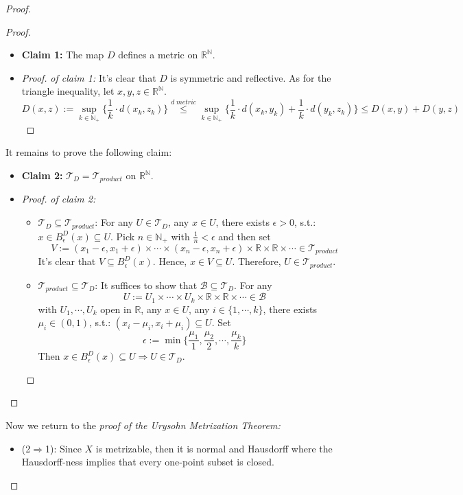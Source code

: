 \begin{proof}
\begin{proof}
        \begin{itemize}
            \item \textbf{Claim 1:} The map $D$ defines a metric on $\mathbb{R}^\mathbb{N}$.
            \item \begin{proof}
                \textit{of claim 1:} It's clear that $D$ is symmetric and reflective. As for the triangle inequality, let $x,y,z \in \mathbb{R}^\mathbb{N}$.
                $$D(x,z) := \sup_{k \in \mathbb{N}_+} \{\frac{1}{k} \cdot d(x_k, z_k) \} \overset{d\;metric}{\leq} \sup_{k \in \mathbb{N}_+} \{\frac{1}{k} \cdot d(x_k, y_k) + \frac{1}{k} \cdot d(y_k, z_k) \} \leq D(x,y) +D(y,z)$$
            \end{proof}
        \end{itemize}
        It remains to prove the following claim:
        \begin{itemize}
            \item \textbf{Claim 2:} $\mathcal{T}_D = \mathcal{T}_{product}$ on $\mathbb{R}^\mathbb{N}$.
            \item \begin{proof}
                \textit{of claim 2:} \begin{itemize}
                    \item $\mathcal{T}_D \subseteq \mathcal{T}_{product}$: For any $U \in \mathcal{T}_D$, any $x \in U$, there exists $\epsilon>0$, s.t.: $x \in B_\epsilon^D (x) \subseteq U$. Pick $n \in \mathbb{N}_+$ with $\frac{1}{n}< \epsilon$ and then set
                    $$V:= (x_1-\epsilon,x_1 + \epsilon) \times \cdots \times  (x_n-\epsilon, x_n+\epsilon) \times \mathbb{R} \times \mathbb{R} \times \cdots \in \mathcal{T}_{product}$$
                    It's clear that $V \subseteq B_\epsilon^D(x)$. Hence, $x \in V \subseteq U$. Therefore, $U \in \mathcal{T}_{product}$.

                    \item $\mathcal{T}_{product} \subseteq \mathcal{T}_D$: It suffices to show that $\mathcal{B} \subseteq \mathcal{T}_D$. For any
                    $$U:= U_1 \times \cdots\times U_k \times \mathbb{R} \times \mathbb{R} \times \cdots \in \mathcal{B}$$
                    with $U_1,\cdots,U_k$ open in $\mathbb{R}$, any $x \in U$, any $i \in \{1,\cdots,k\}$, there exists $\mu_i \in (0,1)$, s.t.: $(x_i -\mu_i,x_i+\mu_i) \subseteq U$. Set
                    $$\epsilon:= \min\{ \frac{\mu_1}{1} ,\frac{\mu_2}{2} ,\cdots, \frac{\mu_k}{k}\}$$
                    Then $x \in B_\epsilon^D (x) \subseteq U \Rightarrow U \in \mathcal{T}_D$.
                \end{itemize}
            \end{proof}
        \end{itemize}
    \end{proof}
    Now we return to the \textit{proof of the Urysohn Metrization Theorem:}
    \begin{itemize}
        \item (2$\Rightarrow$1): Since $X$ is metrizable, then it is normal and Hausdorff where the Hausdorff-ness implies that every one-point subset is closed.


\end{itemize}
\end{proof}
